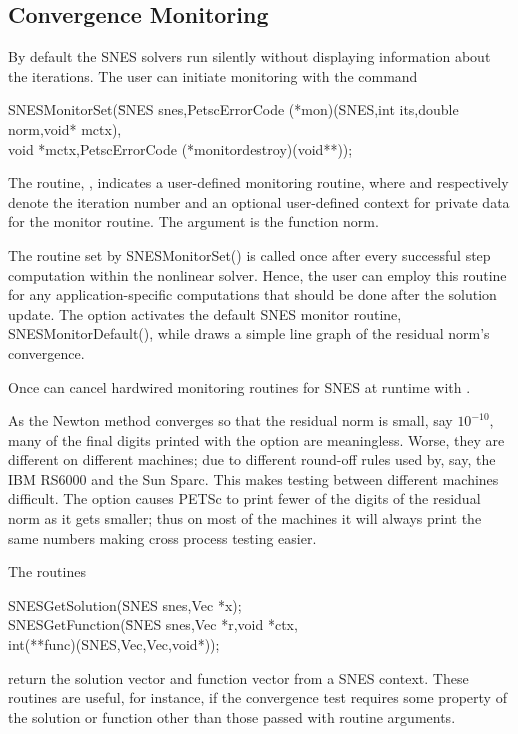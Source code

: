 \subsection{Convergence Monitoring}
\label{sec_snesmonitor}

By default the SNES solvers run silently without displaying information
about the iterations. The user can initiate monitoring with the
command
\begin{tabbing}
  SNESMonitorSet(\=SNES snes,PetscErrorCode (*mon)(SNES,int its,double norm,void* mctx),\\
                 \>        void *mctx,PetscErrorCode (*monitordestroy)(void**));
\end{tabbing}
The routine, , indicates a user-defined monitoring routine,
where  and  respectively denote the iteration
number and an optional user-defined context for private data for the
monitor routine.  The argument  is the function norm.

The routine set by SNESMonitorSet() is called once after every
successful step computation within the nonlinear solver.  Hence, the
user can employ this routine for any application-specific computations
that should be done after the solution update. The option
  activates the default
SNES monitor routine, SNESMonitorDefault(),
while   draws
a simple line graph of the residual norm's convergence.

Once can cancel hardwired monitoring routines for SNES at runtime with
. 

As the Newton method converges so that the residual norm is small,
say $ 10^{-10} $, many of the final digits printed with the 
option are meaningless. Worse, they are different on different
machines; due to different round-off rules used by, say, the IBM RS6000
and the Sun Sparc. This makes testing between different machines
difficult. The option  
causes PETSc to print fewer of the digits of the residual norm
as it gets smaller; thus on most of the machines it will always
print the same numbers making cross process testing easier.

The routines
\begin{tabbing}
  SNESGetSolution(SNES snes,Vec *x);\\
  SNESGetFunction(\=SNES snes,Vec *r,void *ctx,\\
                  \>        int(**func)(SNES,Vec,Vec,void*));
\end{tabbing}
return the solution vector and function vector from a SNES context.
These routines are useful, for instance, if the convergence test requires
some property of the solution or function other than those passed with
routine arguments.

